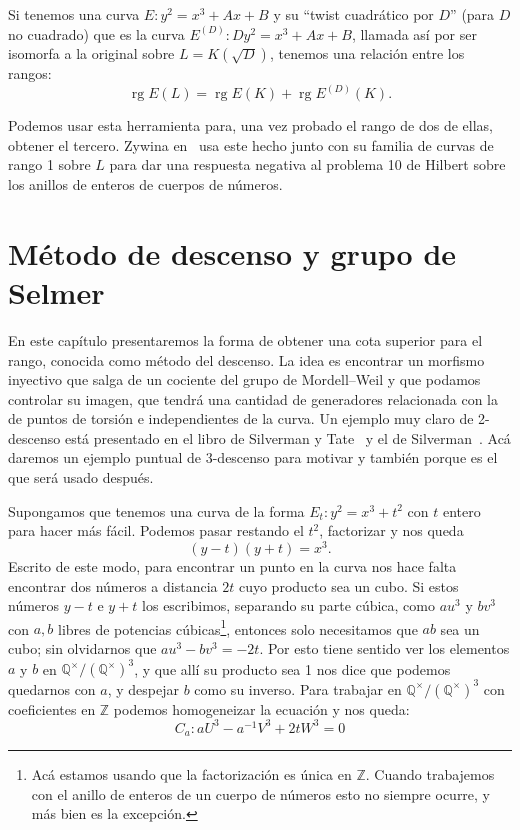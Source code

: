 \documentclass[a4paper]{book}
\theoremstyle{definition}
\theoremstyle{plain}
\DeclareMathOperator{\rg}{rg}
\newcommand{\QQ}{\mathbb{Q}}
\newcommand{\ZZ}{\mathbb{Z}}
\newcommand{\QmodT}{\QQ^\times/{(\QQ^\times)}^3}
\begin{document}
Si tenemos una curva $E:y^2=x^3+Ax+B$ y su ``twist cuadrático por $D$'' (para $D$ no cuadrado) que es la curva $E^{(D)}: Dy^2=x^3+Ax+B$, llamada así por ser isomorfa a la original sobre $L=K(\sqrt D)$, tenemos una relación entre los rangos:
\[
\rg E(L)=\rg E(K)+\rg E^{(D)}(K).
\]

Podemos usar esta herramienta para, una vez probado el rango de dos de ellas, obtener el tercero. Zywina en~\cite{Zywina2025RankStability} usa este hecho junto con su familia de curvas de rango 1 sobre $L$ para dar una respuesta negativa al problema 10 de Hilbert sobre los anillos de enteros de cuerpos de números.



\chapter{Método de descenso y grupo de Selmer}\label{cap:selmer}


En este capítulo presentaremos la forma de obtener una cota superior para el rango, conocida como método del descenso. La idea es encontrar un morfismo inyectivo que salga de un cociente del grupo de Mordell--Weil y que podamos controlar su imagen, que tendrá una cantidad de generadores relacionada con la de puntos de torsión e independientes de la curva. Un ejemplo muy claro de 2-descenso está presentado en el libro de Silverman y Tate~\cite{SilvermanTate} y el de Silverman~\cite{SilvermanAEC}. Acá daremos un ejemplo puntual de 3-descenso para motivar y también porque es el que será usado después.

Supongamos que tenemos una curva de la forma $E_t: y^2=x^3+t^2$ con $t$ entero para hacer más fácil. Podemos pasar restando el $t^2$, factorizar y nos queda 
\[
(y-t)(y+t) = x^3.
\]
Escrito de este modo, para encontrar un punto en la curva nos hace falta encontrar dos números a distancia $2t$ cuyo producto sea un cubo. Si estos números $y-t$ e $y+t$ los escribimos, separando su parte cúbica, como $au^3$ y $bv^3$ con $a,b$ libres de potencias cúbicas\footnote{Acá estamos usando que la factorización es única en $\ZZ$. Cuando trabajemos con el anillo de enteros de un cuerpo de números esto no siempre ocurre, y más bien es la excepción.}, entonces solo necesitamos que $ab$ sea un cubo; sin olvidarnos que $au^3 - bv^3 = -2t$. Por esto tiene sentido ver los elementos $a$ y $b$ en $\QmodT$, y que allí su producto sea 1 nos dice que podemos quedarnos con $a$, y despejar $b$ como su inverso. Para trabajar en $\QmodT$ con coeficientes en $\ZZ$ podemos homogeneizar la ecuación y nos queda:
\[
C_a: aU^3 - a^{-1}V^3 + 2tW^3 = 0
\]
\end{document}
